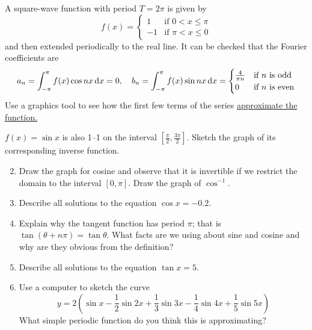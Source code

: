 \begin{example}{}{}
	A square-wave function with period $T=2\pi$ is given by
	\[
		f(x)=
		\begin{cases}
			1&\text{if }0<x\le \pi\\
			-1&\text{if }\pi<x\le 0
		\end{cases}
	\]
	and then extended periodically to the real line. It can be checked that the Fourier coefficients are
	\[
		a_n=\int_{-\pi}^{\pi} f(x)\cos nx\,{\mathrm{d} x}=0,\quad b_n=\int_{-\pi}^{\pi} f(x)\sin nx\,{\mathrm{d} x}=
		\begin{cases}
			\frac 4{\pi n}&\text{if $n$ is odd}\\
			0&\text{if $n$ is even}
		\end{cases}
	\]
	Use a graphics tool to see how the first few terms of the series \href{https://www.math.uci.edu/~ndonalds/math121b/orth-fourier.html}{approximate the function.}
\end{example}


\begin{exercises}
	\exstart $f(x)=\sin x$ is also 1--1 on the interval $[\frac\pi 2,\frac{3\pi}2]$. Sketch the graph of its corresponding inverse function.
	
	\begin{enumerate}\setcounter{enumi}{1}
	  \item Draw the graph for cosine and observe that it is invertible if we restrict the domain to the interval $[0,\pi]$. Draw the graph of $\cos^{-1}$.
	  
	  \item Describe all solutions to the equation $\cos x=-0.2$.
	  
	  \item Explain why the tangent function has period $\pi$; that is $\tan(\theta+n\pi)=\tan \theta$. What facts are we using about sine and cosine and why are they obvious from the definition?
	  
	  \item Describe all solutions to the equation $\tan x=5$.
	  
	  \item Use a computer to sketch the curve
	  \[
	  	y=2\left(\sin x-\frac 12\sin 2x+\frac 13\sin 3x-\frac 14\sin 4x+\frac 15\sin 5x\right)
	  \]
	  What simple periodic function do you think this is approximating?
	\end{enumerate}
\end{exercises}

\clearpage

